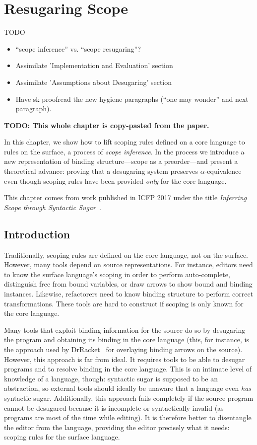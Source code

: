 \chapter{Resugaring Scope}\label{chap:resugar-scope}


TODO
\begin{itemize}
\item ``scope inference'' vs. ``scope resugaring''?
\item Assimilate 'Implementation and Evaluation' section
\item Assimilate 'Assumptions about Desugaring' section
\item Have sk proofread the new hygiene paragraphs (``one may wonder''
  and next paragraph).
\end{itemize}

\textbf{TODO: This whole chapter is copy-pasted from the paper.}

In this chapter, we show how to lift scoping rules defined on a core
language to rules on the surface, a process of \emph{scope inference}.
In the process we introduce a new representation of binding
structure---scope as a preorder---and present a theoretical advance:
proving that a desugaring system preserves $\alpha$-equivalence even
though scoping rules have been provided \emph{only} for the core
language.

This chapter comes from work published in ICFP 2017 under the
title \emph{Inferring Scope through Syntactic Sugar}~\cite{pombrio-scope}.

\section{Introduction}

Traditionally,
scoping rules are defined on the core language, not on the
surface. However, many tools depend on source representations. For
instance, editors need to know the surface language's scoping in order
to perform auto-complete, distinguish free from bound variables, or draw
arrows to show bound and binding instances. Likewise, refactorers need
to know binding structure to perform correct transformations.
These tools are hard to construct if scoping is only known
for the core language.

Many tools that exploit binding information for the source
do so by desugaring the program and obtaining its binding in the core
language (this, for instance, is the approach used by
DrRacket~\cite{drscheme} for overlaying binding arrows on the
source).
However, this approach is far from ideal. It requires tools to be able
to desugar programs and to resolve binding in the core
language. This is an intimate level of knowledge of a language, though:
syntactic sugar is supposed to be an abstraction, so external tools
should ideally be unaware that a language even \emph{has} syntactic
sugar. Additionally, this approach fails completely if the source
program cannot be desugared because it is incomplete or syntactically
invalid (as programs are most of the time while editing). It is
therefore better to disentangle the editor from the language,
providing the editor precisely what it needs: scoping rules for the
surface language.

